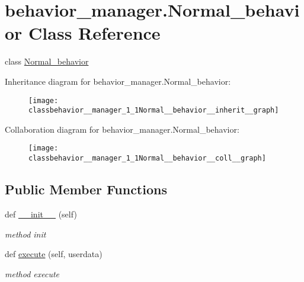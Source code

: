 \hypertarget{classbehavior__manager_1_1Normal__behavior}{}\section{behavior\+\_\+manager.\+Normal\+\_\+behavior Class Reference}
\label{classbehavior__manager_1_1Normal__behavior}


class \hyperlink{classbehavior__manager_1_1Normal__behavior}{Normal\+\_\+behavior}  




Inheritance diagram for behavior\+\_\+manager.\+Normal\+\_\+behavior\+:\nopagebreak
\begin{figure}[H]
\begin{center}
\leavevmode
\texttt{[image: classbehavior\_\_manager\_1\_1Normal\_\_behavior\_\_inherit\_\_graph]}
\end{center}
\end{figure}


Collaboration diagram for behavior\+\_\+manager.\+Normal\+\_\+behavior\+:\nopagebreak
\begin{figure}[H]
\begin{center}
\leavevmode
\texttt{[image: classbehavior\_\_manager\_1\_1Normal\_\_behavior\_\_coll\_\_graph]}
\end{center}
\end{figure}
\subsection*{Public Member Functions}
\begin{DoxyCompactItemize}
\item 
def \hyperlink{classbehavior__manager_1_1Normal__behavior_a7ab22900e936fc3921a269389b51e6ab}{\+\_\+\+\_\+init\+\_\+\+\_\+} (self)
\begin{DoxyCompactList}\small\item\em method init \end{DoxyCompactList}\item 
def \hyperlink{classbehavior__manager_1_1Normal__behavior_a15faab6a43a39510355baad4faaa808a}{execute} (self, userdata)
\begin{DoxyCompactList}\small\item\em method execute \end{DoxyCompactList}\end{DoxyCompactItemize}


